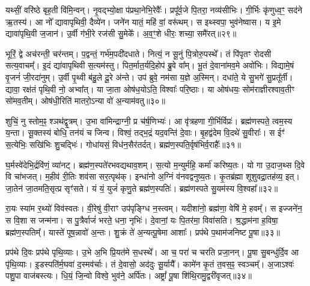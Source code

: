 यथ्सीं॒ वरि॑ष्ठे बृह॒ती वि॑मि॒न्वन्।
नृ॒वद्भ्यो॒क्षा प॑प्रथा॒नेभि॒रेवैः᳚।
प्रपू᳚र्व॒जे पि॒तरा॒ नव्य॑सीभिः।
गी॒र्भिः कृ॑णुध्व॒ꣳ॒ सद॑ने ऋ॒तस्य॑।
आ नो᳚ द्यावापृथिवी॒ दैव्ये॑न।
जने॑न यातं॒ महि॑ वां॒ वरू॑थम्।
स इथ्स्वपा॒ भुव॑नेष्वास।
य इ॒मे द्यावा॑पृथि॒वी ज॒जान॑।
उ॒र्वी ग॑भी॒रे रज॑सी सु॒मेके᳚।
अ॒व॒ꣳ॒शे धीरः॒ शच्या॒ समै॑रत्॥२९॥

भूरिं॒ द्वे अच॑रन्ती॒ चर॑न्तम्।
प॒द्वन्तं॒ गर्भ॑म॒पदी॑दधाते।
नित्यं॒ न सू॒नुं पि॒त्रोरु॒पस्थे᳚।
तं पि॑पृतꣳ रोदसी सत्य॒वाचम्᳚।
इ॒दं द्या॑वापृथिवी स॒त्यम॑स्तु।
पित॒र्मात॒र्यदि॒होप॑ ब्रु॒वे वा᳚म्।
भू॒तं दे॒वाना॑मव॒मे अवो॑भिः।
विद्यामे॒षं वृ॒जनं॑ जी॒रदा॑नुम्।
उ॒र्वी पृ॒थ्वी ब॑हु॒ले दू॒रे अ॑न्ते।
उप॑ ब्रुवे॒ नम॑सा य॒ज्ञे अ॒स्मिन्।
दधा॑ते॒ ये सु॒भगे॑ सु॒प्रतू᳚र्ती।
द्यावा॒ रक्ष॑तं पृथि॒वी नो॒ अभ्वा᳚त्।
या जा॒ता ओष॑ध॒योऽति॒ विश्वाः᳚ परि॒ष्ठाः।
या ओष॑धयः॒ सोम॑राज्ञीरश्वाव॒तीꣳ सो॑मव॒तीम्।
ओष॑धी॒रिति॑ मातरो॒\-ऽन्या वो॑ अ॒न्याम॑वतु॥३०॥\anuvakamend[ह॒विर्नो॑ दाद्भभूव रा॒तिं पू॒र्वहू॑ताव॒र्कैरै॑रद॒स्मिन्पञ्च॑ च]

शुचिं॒ नु स्तोम॒ꣴ॒ श्ञथ॑द्वृ॒त्रम्।
उ॒भा वा॑मिन्द्राग्नी॒ प्र च॑र्\mbox{}ष॒णिभ्यः॑।
आ वृ॑त्रहणा गी॒र्भिर्विप्रः॑।
ब्रह्म॑णस्पते॒ त्वम॒स्य य॒न्ता।
सू॒क्तस्य॑ बोधि॒ तन॑यं च जिन्व।
विश्वं॒ तद्भ॒द्रं यद॒वन्ति॑ दे॒वाः।
बृ॒हद्व॑देम वि॒दथे॑ सु॒वीराः᳚।
स ईꣳ॑ स॒त्येभिः॒ सखि॑भिः शु॒चद्भिः॑।
गोधा॑यसं॒ विध॑न॒सैर॑तर्दत्।
ब्रह्म॑ण॒स्पति॒र्वृष॑भिर्व॒राहैः᳚॥३१॥

घ॒र्मस्वे॑देभि॒र्द्रवि॑णं॒ व्या॑नट्।
ब्रह्म॑ण॒स्पते॑रभवद्यथाव॒शम्।
स॒त्यो म॒न्युर्महि॒ कर्मा॑ करिष्य॒तः।
यो गा उ॒दाज॒थ्स दि॒वे वि चा॑भजत्।
म॒हीव॑ री॒तिः शव॑सा सर॒त्पृथ॑क्।
इन्धा॑नो अ॒ग्निं व॑नवद्वनुष्य॒तः।
कृ॒तब्र॑ह्मा शूशुवद्रा॒तह॑व्य॒ इत्।
जा॒तेन॑ जा॒तमति॒सृत्प्र सृꣳ॑सते।
यं यं॒ युजं॑ कृणु॒ते ब्रह्म॑ण॒स्पतिः॑।
ब्रह्म॑णस्पते सु॒यम॑स्य वि॒श्वहा᳚॥३२॥

रा॒यः स्या॑म र॒थ्यो॑ विव॑स्वतः।
वी॒रेषु॑ वी॒राꣳ उप॑पृङ्ग्धि न॒स्त्वम्।
यदीशा॑नो॒ ब्रह्म॑णा॒ वेषि॑ मे॒ हवम्᳚।
स इज्जने॑न॒ स वि॒शा स जन्म॑ना।
स पु॒त्रैर्वाजं॑ भरते॒ धना॒ नृभिः॑।
दे॒वानां॒ यः पि॒तर॑मा॒ विवा॑सति।
श्र॒द्धाम॑ना ह॒विषा॒ ब्रह्म॑ण॒स्पतिम्᳚।
यास्ते॑ पूष॒न्नावो॑ अ॒न्तः।
शु॒क्रं ते॑ अ॒न्यत्पू॒षेमा आशाः᳚।
प्रप॑थे प॒थाम॑जनिष्ट पू॒षा॥३३॥

प्रप॑थे दि॒वः प्रप॑थे पृथि॒व्याः।
उ॒भे अ॒भि प्रि॒यत॑मे स॒धस्थे᳚।
आ च॒ परा॑ च चरति प्रजा॒नन्।
पू॒षा सु॒बन्धु॑र्दि॒व आ पृ॑थि॒व्याः।
इ॒डस्पति॑र्म॒घवा॑ द॒स्मव॑र्चाः।
तं दे॒वासो॒ अद॑दुः सू॒र्यायै᳚।
कामे॑न कृ॒तं त॒वस॒ꣴ॒ स्वञ्चम्᳚।
अ॒जाऽश्वः॑ पशु॒पा वाज॑बस्त्यः।
धि॒यं॒ जि॒न्वो विश्वे॒ भुव॑ने॒ अर्पि॑तः।
अष्ट्रां᳚ पू॒षा शि॑थि॒रामु॒द्वरी॑वृजत्॥३४॥

